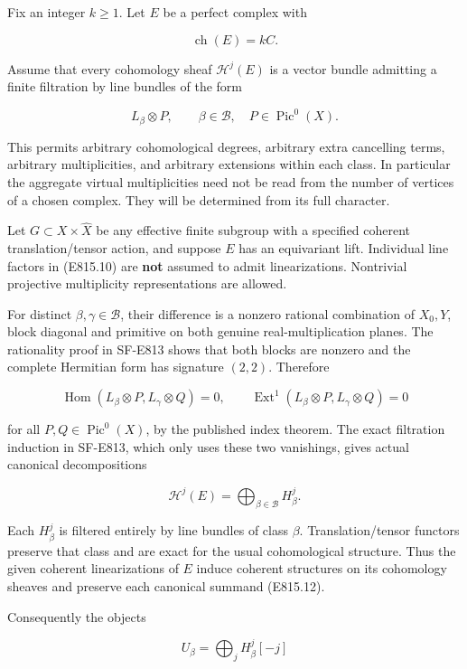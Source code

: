 Fix an integer \(k\ge1\). Let \(E\) be a perfect complex with

\[
 \operatorname{ch}(E)=kC.
 \tag{E815.9}
\]

Assume that every cohomology sheaf \(\mathcal H^j(E)\) is a vector
bundle admitting a finite filtration by line bundles of the form

\[
 L_\beta\otimes P,\qquad\beta\in\mathcal B,
 \quad P\in\operatorname{Pic}^0(X).
 \tag{E815.10}
\]

This permits arbitrary cohomological degrees, arbitrary extra cancelling
terms, arbitrary multiplicities, and arbitrary extensions within each
class. In particular the aggregate virtual multiplicities need not be
read from the number of vertices of a chosen complex. They will be
determined from its full character.

Let \(G\subset X\times\widehat X\) be any effective finite subgroup with
a specified coherent translation/tensor action, and suppose \(E\) has an
equivariant lift. Individual line factors in (E815.10) are \textbf{not}
assumed to admit linearizations. Nontrivial projective multiplicity
representations are allowed.

For distinct \(\beta,\gamma\in\mathcal B\), their difference is a
nonzero rational combination of \(X_0,Y\), block diagonal and primitive
on both genuine real-multiplication planes. The rationality proof in
SF-E813 shows that both blocks are nonzero and the complete Hermitian
form has signature \((2,2)\). Therefore

\[
 \operatorname{Hom}(L_\beta\otimes P,L_\gamma\otimes Q)=0,
 \qquad
 \operatorname{Ext}^1(L_\beta\otimes P,L_\gamma\otimes Q)=0
 \tag{E815.11}
\]

for all \(P,Q\in\operatorname{Pic}^0(X)\), by the published index
theorem. The exact filtration induction in SF-E813, which only uses
these two vanishings, gives actual canonical decompositions

\[
 \mathcal H^j(E)=\bigoplus_{\beta\in\mathcal B} H^j_\beta.
 \tag{E815.12}
\]

Each \(H^j_\beta\) is filtered entirely by line bundles of class
\(\beta\). Translation/tensor functors preserve that class and are exact
for the usual cohomological structure. Thus the given coherent
linearizations of \(E\) induce coherent structures on its cohomology
sheaves and preserve each canonical summand (E815.12).

Consequently the objects

\[
 U_\beta=\bigoplus_j H^j_\beta[-j]
 \tag{E815.13}
\]

